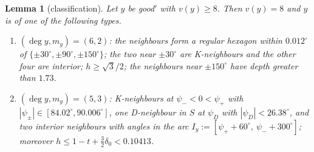 \documentclass[11pt]{amsart}
\newtheorem{lemma}[theorem]{Lemma}
\theoremstyle{definition}
\theoremstyle{remark}
\begin{document}
\begin{lemma}[classification]\label{lem:IIclass}
Let $y$ be good$'$ with $v(y)\ge8$. Then $v(y)=8$ and $y$ is of one of the following types.
\begin{enumerate}[leftmargin=4.6em]
\item[\textup{(A)}] $(\deg y,m_y)=(6,2)$: the neighbours form a regular hexagon within $0.012^\circ$ of $\{\pm30^\circ,\pm90^\circ,\pm150^\circ\}$; the two near $\pm30^\circ$ are K-neighbours and the other four are interior; $h\ge\sqrt3/2$; the neighbours near $\pm150^\circ$ have depth greater than $1.73$.
\item[\textup{(Dt$_{\mathrm{II}}$)}] $(\deg y,m_y)=(5,3)$: K-neighbours at $\psi_-<0<\psi_+$ with $|\psi_\pm|\in[84.02^\circ,90.006^\circ]$, one D-neighbour in $S$ at $\psi_D$ with $|\psi_D|<26.38^\circ$, and two interior neighbours with angles in the arc $I_y:=[\psi_++60^\circ,\ \psi_-+300^\circ]$; moreover $h\le1-t+\frac32\delta_0<0.10413$.
\end{enumerate}
\end{lemma}
\end{document}
